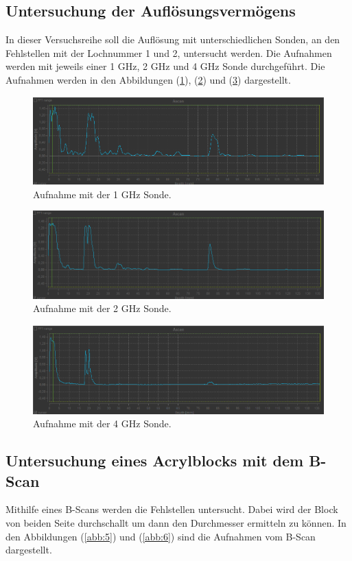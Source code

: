 \subsection{Untersuchung der Auflösungsvermögens}
In dieser Versuchsreihe soll die Auflösung mit unterschiedlichen Sonden, an den Fehlstellen mit
der Lochnummer 1 und 2, untersucht werden.
Die Aufnahmen werden mit jeweils einer 1 GHz, 2 GHz und 4 GHz Sonde durchgeführt. Die Aufnahmen werden
in den Abbildungen (\ref{abb:2}), (\ref{abb:3}) und (\ref{abb:4}) dargestellt.
\begin{figure}[H]
  \centering
  \includegraphics[width=\textwidth]{content/1MHz.png}
  \caption{Aufnahme mit der 1 GHz Sonde.}
  \label{abb:2}
\end{figure}
\begin{figure}[H]
  \centering
  \includegraphics[width=\textwidth]{content/2MHz.png}
  \caption{Aufnahme mit der 2 GHz Sonde.}
  \label{abb:3}
\end{figure}
\begin{figure}[H]
  \centering
  \includegraphics[width=\textwidth]{content/4MHz.png}
  \caption{Aufnahme mit der 4 GHz Sonde.}
  \label{abb:4}
\end{figure}
\subsection{Untersuchung eines Acrylblocks mit dem B-Scan}
Mithilfe eines B-Scans werden die Fehlstellen untersucht.
Dabei wird der Block von beiden Seite durchschallt um dann
den Durchmesser ermitteln zu können.
In den Abbildungen (\ref{abb:5}) und (\ref{abb:6}) sind die Aufnahmen
vom B-Scan dargestellt.

